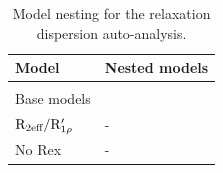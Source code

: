 \begin{landscape}
\begin{center}
\begin{small}

\begin{longtable}{ll}

\caption{Model nesting for the relaxation dispersion auto-analysis.}

\\
\toprule
Model & Nested models\footnotemark[1] \\
\midrule
\endhead

\bottomrule
\endfoot

\label{table: dispersion model nesting}


\\[-5pt]
Base models \\
\cline{1-1}
$\mathrm{R}_{\textrm{2eff}}/\mathrm{R}_{1\rho}'$         & - \\
No Rex                           & - \\


\end{longtable}
\end{small}
\end{center}
\end{landscape}
